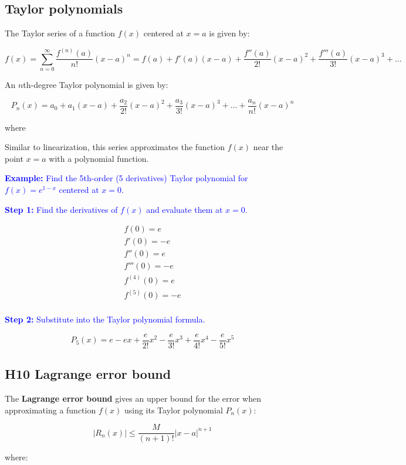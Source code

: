 \documentclass[letterpaper, 12pt]{article}
\newcommand{\example}[1]{\textcolor{blue}{\textbf{Example:} #1}}
\newcommand{\step}[2]{\textcolor{blue}{\textbf{Step #1:} #2}}
\begin{document}
\newpage

\subsection*{Taylor polynomials}

The Taylor series of a function $f(x)$ centered at $x = a$ is given by:

$$f(x) = \sum_{n=0}^\infty \frac{f^{(n)}(a)}{n!} (x-a)^n = f(a) + f'(a)(x-a) + \frac{f''(a)}{2!}(x-a)^2 + \frac{f'''(a)}{3!}(x-a)^3 + \dots$$

An $n$th-degree Taylor polynomial is given by:

$$P_n(x) = a_0 + a_1(x-a) + \frac{a_2}{2!}(x-a)^2 + \frac{a_3}{3!}(x-a)^3 + \dots + \frac{a_n}{n!}(x-a)^n$$

where

Similar to linearization, this series approximates the function $f(x)$ near the point $x = a$ with a polynomial function. 

\example{Find the 5th-order (5 derivatives) Taylor polynomial for $f(x) = e^{1-x}$ centered at $x = 0$.}

\step{1}{Find the derivatives of $f(x)$ and evaluate them at $x = 0$.}

\begin{gather*}
f(0) = e \\
f'(0) = -e \\
f''(0) = e \\
f'''(0) = -e \\
f^{(4)}(0) = e \\
f^{(5)}(0) = -e \\
\end{gather*}

\step{2}{Substitute into the Taylor polynomial formula.}

$$P_5(x) = e - ex + \frac{e}{2!} x^2 - \frac{e}{3!} x^3 + \frac{e}{4!} x^4 - \frac{e}{5!} x^5$$

\subsection*{H10 Lagrange error bound}

The \textbf{Lagrange error bound} gives an upper bound for the error when approximating a function $f(x)$ using its Taylor polynomial $P_n(x)$:

$$|R_n(x)| \leq \frac{M}{(n+1)!} |x-a|^{n+1}$$

where:
\end{document}
